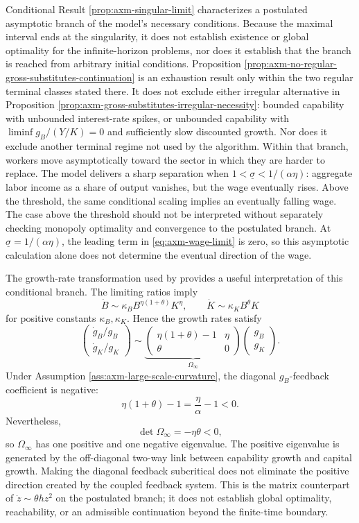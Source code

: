 Conditional Result \ref{prop:axm-singular-limit} characterizes a postulated
asymptotic branch of the model's necessary
conditions. Because the maximal interval ends at the singularity, it does not
establish existence or global optimality for the infinite-horizon problems, nor
does it establish that the branch is reached from arbitrary initial conditions.
Proposition \ref{prop:axm-no-regular-gross-substitutes-continuation} is an
exhaustion result only within the two regular terminal classes stated there. It
does not exclude either irregular alternative in Proposition
\ref{prop:axm-gross-substitutes-irregular-necessity}: bounded capability with
unbounded interest-rate spikes, or unbounded capability with
\(\liminf g_B/(Y/K)=0\) and sufficiently slow discounted growth. Nor does it
exclude another terminal regime not used by the algorithm.
Within that branch, workers move asymptotically toward the sector in which they
are harder to replace. The model delivers a sharp separation when
\(1<\underline\sigma<1/(\alpha\eta)\): aggregate labor income as a share of output
vanishes, but the wage eventually rises. Above the threshold, the same conditional
scaling implies an eventually falling wage. The case above the threshold should
not be interpreted without separately
checking monopoly optimality and convergence to the postulated branch.
At \(\underline\sigma=1/(\alpha\eta)\), the leading term in
\eqref{eq:axm-wage-limit} is zero, so this asymptotic calculation alone does not
determine the eventual direction of the wage.

The growth-rate transformation used by \citet{davidsonetal2026} provides a useful
interpretation of this conditional branch. The limiting ratios imply
\[
 \dot B\sim \kappa_B B^{\eta(1+\theta)}K^\eta,
 \qquad
 \dot K\sim \kappa_K B^\theta K
\]
for positive constants \(\kappa_B,\kappa_K\). Hence the growth rates satisfy
\begin{equation}
 \begin{pmatrix}
  \dot g_B/g_B\\[2pt] \dot g_K/g_K
 \end{pmatrix}
 \sim
 \underbrace{\begin{pmatrix}
  \eta(1+\theta)-1&\eta\\
  \theta&0
 \end{pmatrix}}_{\Omega_\infty}
 \begin{pmatrix}g_B\\g_K\end{pmatrix}.
 \label{eq:axm-singular-feedback-matrix}
\end{equation}
Under Assumption \ref{ass:axm-large-scale-curvature}, the diagonal
\(g_B\)-feedback coefficient is negative:
\[
 \eta(1+\theta)-1=\frac{\eta}{\alpha}-1<0.
\]
Nevertheless,
\[
 \det\Omega_\infty=-\eta\theta<0,
\]
so \(\Omega_\infty\) has one positive and one negative eigenvalue. The positive
eigenvalue is generated by the off-diagonal two-way link between capability
growth and capital growth. Making the diagonal feedback subcritical does not
eliminate the positive direction created by the coupled feedback system. This is
the matrix counterpart of \(\dot z\sim\theta h z^2\) on the postulated branch;
it does not establish global optimality, reachability, or an admissible
continuation beyond the finite-time boundary.

